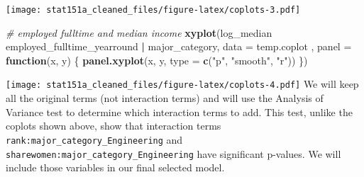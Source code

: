 \documentclass[
]{article}
\newenvironment{Shaded}{\begin{snugshade}}{\end{snugshade}}
\newcommand{\CommentTok}[1]{\textcolor[rgb]{0.56,0.35,0.01}{\textit{#1}}}
\newcommand{\ControlFlowTok}[1]{\textcolor[rgb]{0.13,0.29,0.53}{\textbf{#1}}}
\newcommand{\DataTypeTok}[1]{\textcolor[rgb]{0.13,0.29,0.53}{#1}}
\newcommand{\KeywordTok}[1]{\textcolor[rgb]{0.13,0.29,0.53}{\textbf{#1}}}
\newcommand{\NormalTok}[1]{#1}
\newcommand{\OperatorTok}[1]{\textcolor[rgb]{0.81,0.36,0.00}{\textbf{#1}}}
\newcommand{\StringTok}[1]{\textcolor[rgb]{0.31,0.60,0.02}{#1}}
\begin{document}
\texttt{[image: stat151a\_cleaned\_files/figure-latex/coplots-3.pdf]}

\begin{Shaded}
\begin{Highlighting}[]
\CommentTok{# employed fulltime and median income }
\KeywordTok{xyplot}\NormalTok{(log_median }\OperatorTok{~}\StringTok{ }\NormalTok{employed_fulltime_yearround }\OperatorTok{|}\StringTok{ }\NormalTok{major_category, }\DataTypeTok{data =}\NormalTok{ temp.coplot ,}
       \DataTypeTok{panel =} \ControlFlowTok{function}\NormalTok{(x, y) \{}
\KeywordTok{panel.xyplot}\NormalTok{(x, y, }\DataTypeTok{type =} \KeywordTok{c}\NormalTok{(}\StringTok{"p"}\NormalTok{, }\StringTok{"smooth"}\NormalTok{, }\StringTok{"r"}\NormalTok{))}
\NormalTok{\})}
\end{Highlighting}
\end{Shaded}

\texttt{[image: stat151a\_cleaned\_files/figure-latex/coplots-4.pdf]} We
will keep all the original terms (not interaction terms) and will use
the Analysis of Variance test to determine which interaction terms to
add. This test, unlike the coplots shown above, show that interaction
terms \texttt{rank:major\_category\_Engineering} and
\texttt{sharewomen:major\_category\_Engineering} have significant
p-values. We will include those variables in our final selected model.
\end{document}
